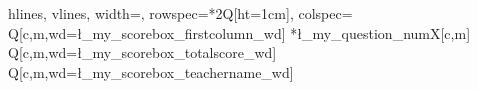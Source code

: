 \documentclass[fontset=ubuntu]{ctexart}
\begin{document}

\noindent
\begin{tblr}[%
    expand=\tblrbody
    ]{%
    hlines,
    vlines,
    width=\textwidth,
    rowspec={*{2}{Q[ht=1cm]}},
    colspec={
        Q[c,m,wd=\l_my_scorebox_firstcolumn_wd]
        *{\l_my_question_num}{X[c,m]}
        Q[c,m,wd=\l_my_scorebox_totalscore_wd]
        Q[c,m,wd=\l_my_scorebox_teachername_wd]
    }
}
\tblrbody
\end{tblr}
\par

\ExplSyntaxOff
\end{document}
